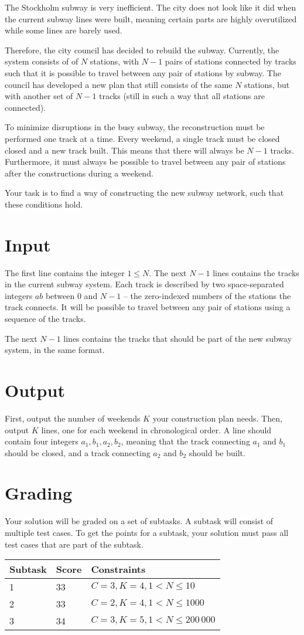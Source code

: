\def\version{1}
The Stockholm subway is very inefficient.
The city does not look like it did when the current subway lines were built, meaning certain parts are highly overutilized while some lines are barely used.

Therefore, the city council has decided to rebuild the subway.
Currently, the system consists of of $N$ stations, with $N - 1$ pairs of stations connected by tracks such that it is possible to travel between any pair of stations by subway.
The council has developed a new plan that still consists of the same $N$ stations, but with another set of $N - 1$ tracks (still in such a way that all stations are connected).

To minimize disruptions in the busy subway, the reconstruction must be performed one track at a time.
Every weekend, a single track must be closed closed and a new track built.
This means that there will always be $N - 1$ tracks.
Furthermore, it must always be possible to travel between any pair of stations after the constructions during a weekend.

Your task is to find a way of constructing the new subway network, such that these conditions hold.

\section*{Input}
The first line contains the integer $1 \le N$.
The next $N - 1$ lines contains the tracks in the current subway system.
Each track is described by two space-separated integers $a b$ between $0$ and $N - 1$ -- the zero-indexed numbers of the stations the track connects.
It will be possible to travel between any pair of stations using a sequence of the tracks.

The next $N - 1$ lines contains the tracks that should be part of the new subway system, in the same format.

\section*{Output}
First, output the number of weekends $K$ your construction plan needs.
Then, output $K$ lines, one for each weekend in chronological order.
A line should contain four integers $a_1, b_1, a_2, b_2$, meaning that the track connecting $a_1$ and $b_1$ should be closed, and a track connecting $a_2$ and $b_2$ should be built.

\section*{Grading}
Your solution will be graded on a set of subtasks.
A subtask will consist of multiple test cases.
To get the points for a subtask, your solution must pass all test cases that are part of the subtask.

\noindent
\begin{tabular}{| l | l | l |}
\hline
Subtask & Score & Constraints \\ \hline
1       & 33    & $C = 3, K = 4, 1 < N \le 10$ \\ \hline
2       & 33    & $C = 2, K = 4, 1 < N \le 1000$ \\ \hline
3       & 34    & $C = 3, K = 5, 1 < N \le 200\,000$ \\ \hline
\end{tabular}
